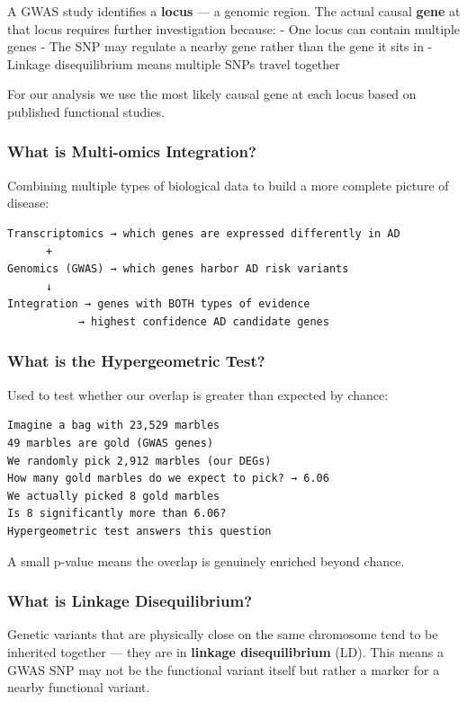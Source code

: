 \documentclass[
]{article}
\begin{document}
A GWAS study identifies a \textbf{locus} --- a genomic region. The
actual causal \textbf{gene} at that locus requires further investigation
because: - One locus can contain multiple genes - The SNP may regulate a
nearby gene rather than the gene it sits in - Linkage disequilibrium
means multiple SNPs travel together

For our analysis we use the most likely causal gene at each locus based
on published functional studies.

\subsubsection{What is Multi-omics
Integration?}\label{what-is-multi-omics-integration}

Combining multiple types of biological data to build a more complete
picture of disease:

\begin{verbatim}
Transcriptomics → which genes are expressed differently in AD
      +
Genomics (GWAS) → which genes harbor AD risk variants
      ↓
Integration → genes with BOTH types of evidence
           → highest confidence AD candidate genes
\end{verbatim}

\subsubsection{What is the Hypergeometric
Test?}\label{what-is-the-hypergeometric-test}

Used to test whether our overlap is greater than expected by chance:

\begin{verbatim}
Imagine a bag with 23,529 marbles
49 marbles are gold (GWAS genes)
We randomly pick 2,912 marbles (our DEGs)
How many gold marbles do we expect to pick? → 6.06
We actually picked 8 gold marbles
Is 8 significantly more than 6.06?
Hypergeometric test answers this question
\end{verbatim}

A small p-value means the overlap is genuinely enriched beyond chance.

\subsubsection{What is Linkage
Disequilibrium?}\label{what-is-linkage-disequilibrium}

Genetic variants that are physically close on the same chromosome tend
to be inherited together --- they are in \textbf{linkage disequilibrium}
(LD). This means a GWAS SNP may not be the functional variant itself but
rather a marker for a nearby functional variant.
\end{document}

